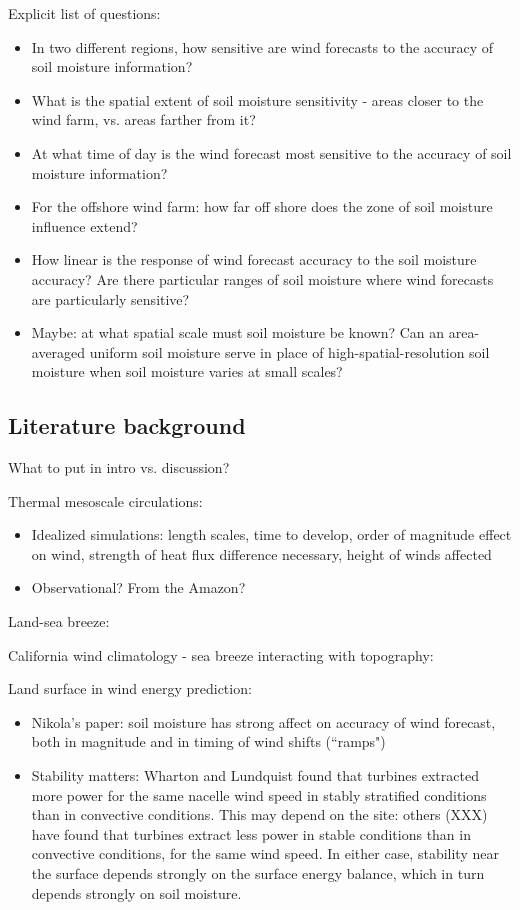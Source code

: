 \documentclass[12pt]{amsart}
\begin{document}
Explicit list of questions:
\begin{itemize}
\item In two different regions, how sensitive are wind forecasts to the accuracy of soil moisture information?
\item What is the spatial extent of soil moisture sensitivity - areas closer to the wind farm, vs. areas farther from it?
\item At what time of day is the wind forecast most sensitive to the accuracy of soil moisture information?
\item For the offshore wind farm: how far off shore does the zone of soil moisture influence extend?
\item How linear is the response of wind forecast accuracy to the soil moisture accuracy?  Are there particular ranges of soil moisture where wind forecasts are particularly sensitive?
\item Maybe: at what spatial scale must soil moisture be known?  Can an area-averaged uniform soil moisture serve in place of high-spatial-resolution soil moisture when soil moisture varies at small scales?
\end{itemize}


\subsection{Literature background}

What to put in intro vs. discussion?

Thermal mesoscale circulations:
\begin{itemize}
\item Idealized simulations: length scales, time to develop, order of magnitude effect on wind, strength of heat flux difference necessary, height of winds affected
\item Observational?  From the Amazon?
\end{itemize}

Land-sea breeze:

California wind climatology - sea breeze interacting with topography:

Land surface in wind energy prediction:
\begin{itemize}
\item Nikola's paper: soil moisture has strong affect on accuracy of wind forecast, both in magnitude and in timing of wind shifts (``ramps")
\item Stability matters: Wharton and Lundquist found that turbines extracted more power for the same nacelle wind speed in stably stratified conditions than in convective conditions.  This may depend on the site: others (XXX) have found that turbines extract less power in stable conditions than in convective conditions, for the same wind speed.  In either case, stability near the surface depends strongly on the surface energy balance, which in turn depends strongly on soil moisture.
\end{itemize}
\end{document}
